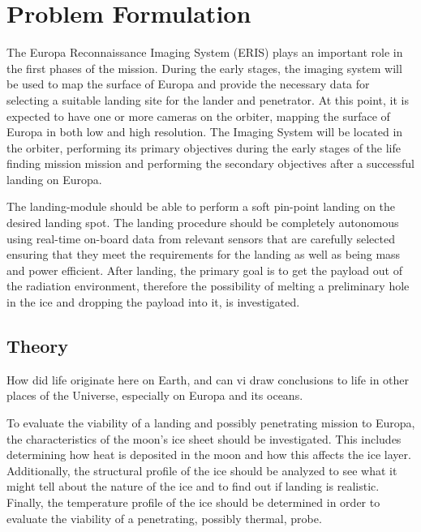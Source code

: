 \chapter{Problem Formulation}

The Europa Reconnaissance Imaging System (ERIS) plays an important role in the first phases of the mission. During the early stages, the imaging system will be used to map the surface of Europa and provide the necessary data for selecting a suitable landing site for the lander and penetrator. At this point, it is expected to have one or more cameras on the orbiter, mapping the surface of Europa in both low and high resolution. The Imaging System will be located in the orbiter, performing its primary objectives during the early stages of the life finding mission mission and performing the secondary objectives after a successful landing on Europa.

The landing-module should be able to perform a soft pin-point landing on the desired landing spot. The landing procedure should be completely autonomous using real-time on-board data from relevant sensors that are carefully selected ensuring that they meet the requirements for the landing as well as being mass and power efficient. After landing, the primary goal is to get the payload out of the radiation environment, therefore the possibility of melting a preliminary hole in the ice and dropping the payload into it, is investigated.

\section{Theory}
How did life originate here on Earth, and can vi draw conclusions to life in other places of the Universe, especially on Europa and its oceans.

To evaluate the viability of a landing and possibly penetrating mission to Europa, the characteristics of the moon's ice sheet should be investigated. This includes determining how heat is deposited in the moon and how this affects the ice layer. Additionally, the structural profile of the ice should be analyzed to see what it might tell about the nature of the ice and to find out if landing is realistic. Finally, the temperature profile of the ice should be determined in order to evaluate the viability of a penetrating, possibly thermal, probe.

